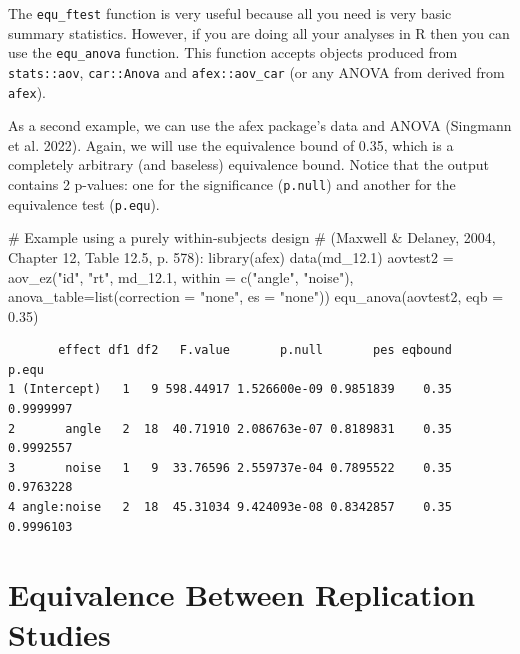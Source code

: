 \documentclass[
]{interact}
\newenvironment{Shaded}{\begin{snugshade}}{\end{snugshade}}
\newcommand{\AttributeTok}[1]{\textcolor[rgb]{0.40,0.45,0.13}{#1}}
\newcommand{\CommentTok}[1]{\textcolor[rgb]{0.37,0.37,0.37}{#1}}
\newcommand{\FloatTok}[1]{\textcolor[rgb]{0.68,0.00,0.00}{#1}}
\newcommand{\FunctionTok}[1]{\textcolor[rgb]{0.28,0.35,0.67}{#1}}
\newcommand{\NormalTok}[1]{\textcolor[rgb]{0.00,0.23,0.31}{#1}}
\newcommand{\OtherTok}[1]{\textcolor[rgb]{0.00,0.23,0.31}{#1}}
\newcommand{\StringTok}[1]{\textcolor[rgb]{0.13,0.47,0.30}{#1}}
\begin{document}
\newpage

The \texttt{equ\_ftest} function is very useful because all you need is
very basic summary statistics. However, if you are doing all your
analyses in R then you can use the \texttt{equ\_anova} function. This
function accepts objects produced from \texttt{stats::aov},
\texttt{car::Anova} and \texttt{afex::aov\_car} (or any ANOVA from
derived from \texttt{afex}).

As a second example, we can use the afex package's data and ANOVA
(Singmann et al. 2022). Again, we will use the equivalence bound of
0.35, which is a completely arbitrary (and baseless) equivalence bound.
Notice that the output contains 2 p-values: one for the significance
(\texttt{p.null}) and another for the equivalence test (\texttt{p.equ}).

\begin{Shaded}
\begin{Highlighting}[]
\CommentTok{\# Example using a purely within{-}subjects design }
\CommentTok{\# (Maxwell \& Delaney, 2004, Chapter 12, Table 12.5, p. 578):}
\FunctionTok{library}\NormalTok{(afex)}
\FunctionTok{data}\NormalTok{(md\_12}\FloatTok{.1}\NormalTok{)}
\NormalTok{aovtest2 }\OtherTok{=} \FunctionTok{aov\_ez}\NormalTok{(}\StringTok{"id"}\NormalTok{, }\StringTok{"rt"}\NormalTok{, md\_12}\FloatTok{.1}\NormalTok{, }\AttributeTok{within =} \FunctionTok{c}\NormalTok{(}\StringTok{"angle"}\NormalTok{, }\StringTok{"noise"}\NormalTok{), }
       \AttributeTok{anova\_table=}\FunctionTok{list}\NormalTok{(}\AttributeTok{correction =} \StringTok{"none"}\NormalTok{, }\AttributeTok{es =} \StringTok{"none"}\NormalTok{))}
\FunctionTok{equ\_anova}\NormalTok{(aovtest2,}
          \AttributeTok{eqb =} \FloatTok{0.35}\NormalTok{)}
\end{Highlighting}
\end{Shaded}

\begin{verbatim}
       effect df1 df2   F.value       p.null       pes eqbound     p.equ
1 (Intercept)   1   9 598.44917 1.526600e-09 0.9851839    0.35 0.9999997
2       angle   2  18  40.71910 2.086763e-07 0.8189831    0.35 0.9992557
3       noise   1   9  33.76596 2.559737e-04 0.7895522    0.35 0.9763228
4 angle:noise   2  18  45.31034 9.424093e-08 0.8342857    0.35 0.9996103
\end{verbatim}

\newpage

\hypertarget{equivalence-between-replication-studies}{%
\section{Equivalence Between Replication
Studies}\label{equivalence-between-replication-studies}}
\end{document}
